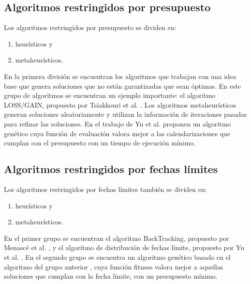 \subsection{Algoritmos restringidos por presupuesto}

Los algoritmos restringidos por presupuesto se dividen en: 

\begin{enumerate}
\item{heurísticos y}
\item{metaheurísticos.}
\end{enumerate}

En la primera división se encuentran los algoritmos que trabajan con una idea base que genera soluciones que no están garantizadas que sean óptimas. En este grupo de algoritmos se encuentran un ejemplo importante: el algoritmo LOSS/GAIN, propuesto por Tsiakkouri et al. \cite{sakellariou2007scheduling}. Los algoritmos metaheurísticos generan soluciones aleatoriamente y utilizan la información de iteraciones pasadas para refinar las soluciones. En el trabajo de Yu et al. \cite{yu2006scheduling} proponen un algoritmo genético cuya función de evaluación valora mejor a las calendarizaciones que cumplan con el presupuesto con un tiempo de ejecución mínimo.

\subsection{Algoritmos restringidos por fechas límites}

Los algoritmos restringidos por fechas límites también se dividen en:

\begin{enumerate}
\item{heurísticos y}
\item{metaheurísticos.}
\end{enumerate}

En el primer grupo se encuentran el algoritmo BackTracking, propuesto por Menascé et al. \cite{menasce2004framework}, y el algoritmo de distribución de fechas límite, propuesto por Yu et al. \cite{yu2005cost}. En el segundo grupo se encuentra un algoritmo genético basado en el algoritmo del grupo anterior \cite{yu2006scheduling}, cuya función fitness valora mejor a aquellas soluciones que cumplan con la fecha límite, con un presupuesto mínimo.

